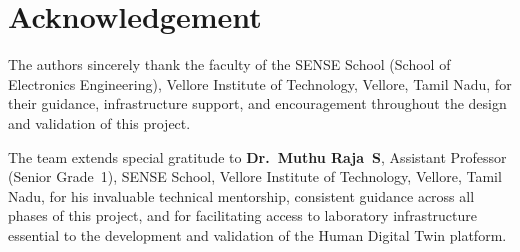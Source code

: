\documentclass[12pt,a4paper]{article}
\begin{document}
\section*{Acknowledgement}

The authors sincerely thank the faculty of the SENSE School (School of Electronics
Engineering), Vellore Institute of Technology, Vellore, Tamil Nadu, for their
guidance, infrastructure support, and encouragement throughout the design and
validation of this project.

The team extends special gratitude to \textbf{Dr.~Muthu Raja~S}, Assistant Professor (Senior Grade~1), SENSE School, Vellore Institute of Technology, Vellore, Tamil Nadu, for his invaluable technical mentorship, consistent guidance across all phases of this project, and for facilitating access to laboratory infrastructure essential to the development and validation of the Human Digital Twin platform.
\end{document}
